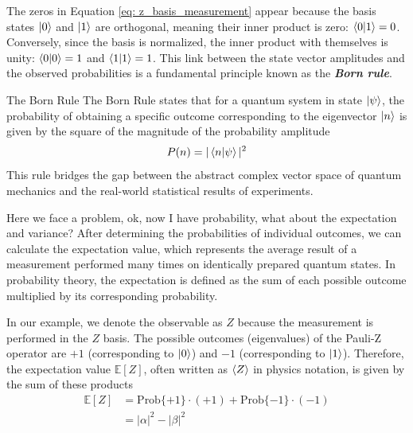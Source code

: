 \documentclass[11pt, letterpaper]{article}
\begin{document}
The zeros in Equation \ref{eq: z_basis_measurement} appear because the basis states $\ket{0}$ and $\ket{1}$ are orthogonal, meaning their inner product is zero: $\braket{0|1} = 0$. Conversely, since the basis is normalized, the inner product with themselves is unity: $\braket{0|0} = 1$ and $\braket{1|1} = 1$. This link between the state vector amplitudes and the observed probabilities is a fundamental principle known as the \textbf{\textit{Born rule}}.

\begin{SBUBox}{The Born Rule}
The Born Rule states that for a quantum system in state $\ket{\psi}$, the probability of obtaining a specific outcome corresponding to the eigenvector $\ket{n}$ is given by the square of the magnitude of the probability amplitude
\begin{equation*}
P(n) = |\braket{n|\psi}|^2
\end{equation*}
This rule bridges the gap between the abstract complex vector space of quantum mechanics and the real-world statistical results of experiments.
\end{SBUBox}

Here we face a problem, ok, now I have probability, what about the expectation and variance? After determining the probabilities of individual outcomes, we can calculate the expectation value, which represents the average result of a measurement performed many times on identically prepared quantum states. In probability theory, the expectation is defined as the sum of each possible outcome multiplied by its corresponding probability.

In our example, we denote the observable as $Z$ because the measurement is performed in the $Z$ basis. The possible outcomes (eigenvalues) of the Pauli-Z operator are $+1$ (corresponding to $\ket{0}$) and $-1$ (corresponding to $\ket{1}$). Therefore, the expectation value $\mathbb{E}[Z]$, often written as $\braket{Z}$ in physics notation, is given by the sum of these products
\begin{equation}
  \begin{aligned}
    \mathbb{E}[Z] &= \text{Prob}\{+1\} \cdot (+1) + \text{Prob}\{-1\} \cdot (-1) \\
    &= |\alpha|^2 - |\beta|^2
  \end{aligned}
\label{eq: expectation_value}
\end{equation}
\end{document}
